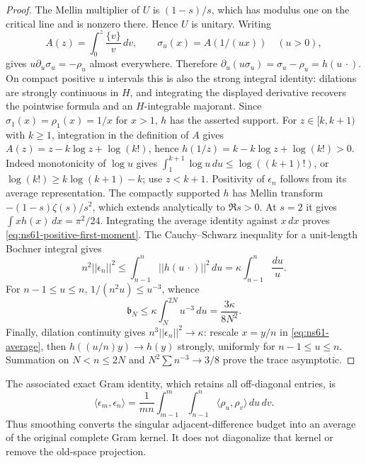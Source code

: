 \documentclass[11pt]{article}
\def\norm#1{||#1||}%
\theoremstyle{remark}
\newcommand{\norm}[1]{\left\lVert #1\right\rVert}
\begin{document}
\begin{proof}
The Mellin multiplier of $U$ is $(1-s)/s$, which has modulus one on
the critical line and is nonzero there. Hence $U$ is unitary.
Writing
\[
 A(z)=\int_0^z\frac{\{v\}}v\,dv,
 \qquad \sigma_u(x)=A(1/(ux))\quad(u>0),
\]
gives $u\partial_u\sigma_u=-\rho_u$ almost everywhere. Therefore
$\partial_u(u\sigma_u)=\sigma_u-\rho_u=h(u\,\cdot)$.
On compact positive $u$ intervals this is also the strong integral
identity: dilations are strongly continuous in $H$, and integrating
the displayed derivative recovers the pointwise formula and an
$H$-integrable majorant. Since $\sigma_1(x)=\rho_1(x)=1/x$ for
$x>1$, $h$ has the asserted support.
For $z\in[k,k+1)$ with $k\geq1$, integration in the definition of
$A$ gives $A(z)=z-k\log z+\log(k!)$, hence
$h(1/z)=k-k\log z+\log(k!)>0$.
Indeed monotonicity of $\log u$ gives
$\int_1^{k+1}\log u\,du\leq\log((k+1)!)$, or
$\log(k!)\geq k\log(k+1)-k$; use $z<k+1$.
Positivity of $\epsilon_n$ follows from its average representation.
The compactly supported $h$ has Mellin transform
$-(1-s)\zeta(s)/s^2$, which extends analytically to $\Re s>0$.
At $s=2$ it gives $\int xh(x)\,dx=\pi^2/24$. Integrating the
average identity against $x\,dx$ proves
\eqref{eq:ns61-positive-first-moment}.
The Cauchy--Schwarz inequality for a unit-length Bochner integral gives
\[
 n^2\norm{\epsilon_n}^2\leq
 \int_{n-1}^{n}\norm{h(u\,\cdot)}^2\,du
 =\kappa\int_{n-1}^{n}\frac{du}{u}.
\]
For $n-1\leq u\leq n$, $1/(n^2u)\leq u^{-3}$, whence
\[
 \mathfrak b_N\leq\kappa\int_N^{2N}u^{-3}\,du
       =\frac{3\kappa}{8N^2}.
\]
Finally, dilation continuity gives
$n^3\norm{\epsilon_n}^2\to\kappa$: rescale $x=y/n$ in
\eqref{eq:ns61-average}, then $h((u/n)y)\to h(y)$ strongly,
uniformly for $n-1\leq u\leq n$. Summation on $N<n\leq2N$
and $N^2\sum n^{-3}\to3/8$ prove the trace asymptotic.
\end{proof}

The associated exact Gram identity, which retains all off-diagonal
entries, is
\begin{equation}
 \langle\epsilon_m,\epsilon_n\rangle
 =\frac1{mn}\int_{m-1}^{m}\int_{n-1}^{n}
        \langle\rho_u,\rho_v\rangle\,du\,dv.
 \label{eq:ns61-averaged-full-gram}
\end{equation}
Thus smoothing converts the singular adjacent-difference budget into
an average of the original complete Gram kernel. It does not diagonalize
that kernel or remove the old-space projection.
\end{document}
